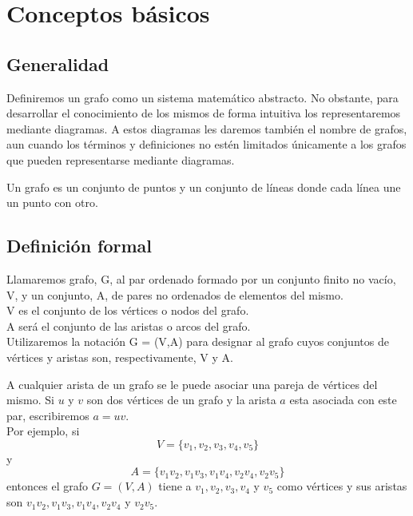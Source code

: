 \chapter{Conceptos básicos}
\label{chap:conceptos basicos}

\section{Generalidad}

Definiremos un grafo como un sistema matemático abstracto. No obstante, para desarrollar el conocimiento de los mismos de forma intuitiva los representaremos mediante diagramas. A estos diagramas les daremos también el nombre de grafos, aun cuando los términos y definiciones no estén limitados únicamente a los grafos que pueden representarse mediante diagramas.

Un grafo es un conjunto de puntos y un conjunto de líneas donde cada línea une un punto con otro. 

\section{Definición formal}

\begin{fondo}
Llamaremos grafo, G, al par ordenado formado por un conjunto finito no vacío, V, y un conjunto, A, de pares no ordenados de elementos del mismo.\\
\smallskip
\quad V es el conjunto de los vértices o nodos del grafo.\\
\smallskip
\quad A será el conjunto de las aristas o arcos del grafo.\\
\smallskip
Utilizaremos la notación G = (V,A) para designar al grafo cuyos conjuntos de vértices y aristas son, respectivamente, V y A.
\end{fondo}

A cualquier arista de un grafo se le puede asociar una pareja de vértices del mismo. Si $u$ y $v$ son dos vértices de un grafo y la arista $a$ esta asociada con este par, escribiremos $a = uv$.\\

Por ejemplo, si\\
\[ V = \{v_1, v_2, v_3, v_4, v_5\} \]
y\\
\[ A = \{v_1v_2, v_1v_3, v_1v_4, v_2v_4, v_2v_5\} \]
entonces el grafo $G = (V,A)$ tiene a $v_1, v_2, v_3, v_4$ y $v_5$ como vértices y sus aristas son $v_1v_2, v_1v_3, v_1v_4, v_2v_4$ y $v_2v_5$.

